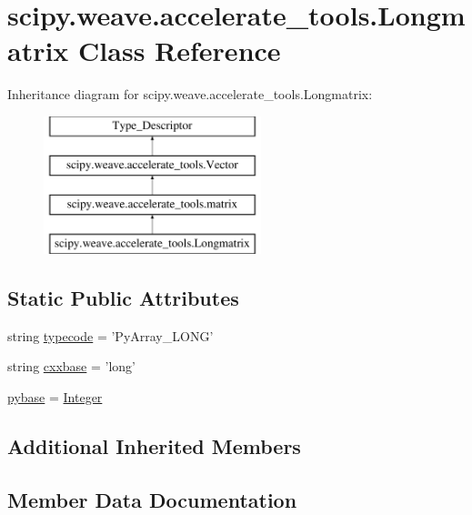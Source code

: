 \hypertarget{classscipy_1_1weave_1_1accelerate__tools_1_1Longmatrix}{}\section{scipy.\+weave.\+accelerate\+\_\+tools.\+Longmatrix Class Reference}
\label{classscipy_1_1weave_1_1accelerate__tools_1_1Longmatrix}
Inheritance diagram for scipy.\+weave.\+accelerate\+\_\+tools.\+Longmatrix\+:\begin{figure}[H]
\begin{center}
\leavevmode
\includegraphics[height=4.000000cm]{classscipy_1_1weave_1_1accelerate__tools_1_1Longmatrix}
\end{center}
\end{figure}
\subsection*{Static Public Attributes}
\begin{DoxyCompactItemize}
\item 
string \hyperlink{classscipy_1_1weave_1_1accelerate__tools_1_1Longmatrix_a5aa7f4b424733aba5c2f38df60a19efd}{typecode} = 'Py\+Array\+\_\+\+L\+O\+N\+G'
\item 
string \hyperlink{classscipy_1_1weave_1_1accelerate__tools_1_1Longmatrix_a00139706be6d12c0123e88614ab136c1}{cxxbase} = 'long'
\item 
\hyperlink{classscipy_1_1weave_1_1accelerate__tools_1_1Longmatrix_a67747613f2473603959d8ff935610c19}{pybase} = \hyperlink{classscipy_1_1weave_1_1accelerate__tools_1_1Integer}{Integer}
\end{DoxyCompactItemize}
\subsection*{Additional Inherited Members}


\subsection{Member Data Documentation}
\hypertarget{classscipy_1_1weave_1_1accelerate__tools_1_1Longmatrix_a00139706be6d12c0123e88614ab136c1}{}
